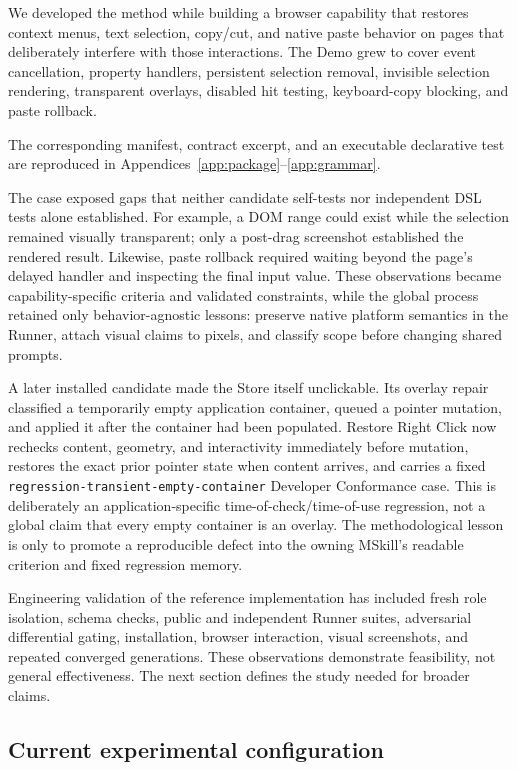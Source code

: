 \documentclass[10pt]{article}
\begin{document}
We developed the method while building a browser capability that restores context menus, text selection, copy/cut, and native paste behavior on pages that deliberately interfere with those interactions. The Demo grew to cover event cancellation, property handlers, persistent selection removal, invisible selection rendering, transparent overlays, disabled hit testing, keyboard-copy blocking, and paste rollback.

The corresponding manifest, contract excerpt, and an executable declarative test are
reproduced in Appendices~\ref{app:package}--\ref{app:grammar}.

The case exposed gaps that neither candidate self-tests nor independent DSL tests alone established. For example, a DOM range could exist while the selection remained visually transparent; only a post-drag screenshot established the rendered result. Likewise, paste rollback required waiting beyond the page's delayed handler and inspecting the final input value. These observations became capability-specific criteria and validated constraints, while the global process retained only behavior-agnostic lessons: preserve native platform semantics in the Runner, attach visual claims to pixels, and classify scope before changing shared prompts.

A later installed candidate made the Store itself unclickable. Its overlay repair classified a
temporarily empty application container, queued a pointer mutation, and applied it after the
container had been populated. Restore Right Click now rechecks content, geometry, and interactivity
immediately before mutation, restores the exact prior pointer state when content arrives, and carries
a fixed \texttt{regression-transient-empty-container} Developer Conformance case. This is deliberately
an application-specific time-of-check/time-of-use regression, not a global claim that every empty
container is an overlay. The methodological lesson is only to promote a reproducible defect into the
owning MSkill's readable criterion and fixed regression memory.

Engineering validation of the reference implementation has included fresh role isolation, schema checks, public and independent Runner suites, adversarial differential gating, installation, browser interaction, visual screenshots, and repeated converged generations. These observations demonstrate feasibility, not general effectiveness. The next section defines the study needed for broader claims.

\subsection{Current experimental configuration}
\end{document}
